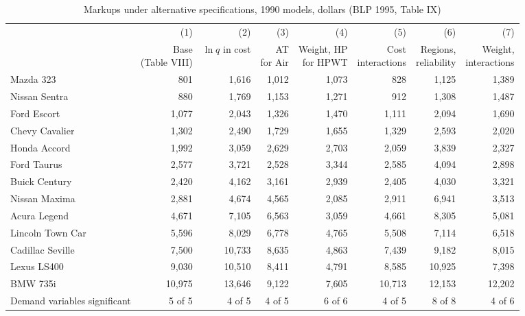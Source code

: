 \begin{table}[htbp]
\centering
\caption{Markups under alternative specifications, 1990 models, dollars (BLP 1995, Table IX)}
\label{tab:08-blp-robust}
\footnotesize
\setlength{\tabcolsep}{4pt}
\begin{tabular}{@{}lrrrrrrr@{}}
\toprule
 & (1) & (2) & (3) & (4) & (5) & (6) & (7) \\
 & \makecell{Base\\(Table VIII)} & \makecell{$\ln q$\\in cost} & \makecell{AT\\for Air}
 & \makecell{Weight, HP\\for HPWT} & \makecell{Cost\\interactions} & \makecell{Regions,\\reliability}
 & \makecell{Weight,\\interactions} \\
\midrule
Mazda 323        & 801    & 1,616  & 1,012 & 1,073 & 828    & 1,125  & 1,389 \\
Nissan Sentra    & 880    & 1,769  & 1,153 & 1,271 & 912    & 1,308  & 1,487 \\
Ford Escort      & 1,077  & 2,043  & 1,326 & 1,470 & 1,111  & 2,094  & 1,690 \\
Chevy Cavalier   & 1,302  & 2,490  & 1,729 & 1,655 & 1,329  & 2,593  & 2,020 \\
Honda Accord     & 1,992  & 3,059  & 2,629 & 2,703 & 2,059  & 3,839  & 2,327 \\
Ford Taurus      & 2,577  & 3,721  & 2,528 & 3,344 & 2,585  & 4,094  & 2,898 \\
Buick Century    & 2,420  & 4,162  & 3,161 & 2,939 & 2,405  & 4,030  & 3,321 \\
Nissan Maxima    & 2,881  & 4,674  & 4,565 & 2,085 & 2,911  & 6,941  & 3,513 \\
Acura Legend     & 4,671  & 7,105  & 6,563 & 3,059 & 4,661  & 8,305  & 5,081 \\
Lincoln Town Car & 5,596  & 8,029  & 6,778 & 4,765 & 5,508  & 7,114  & 6,518 \\
Cadillac Seville & 7,500  & 10,733 & 8,635 & 4,863 & 7,439  & 9,182  & 8,015 \\
Lexus LS400      & 9,030  & 10,510 & 8,411 & 4,791 & 8,585  & 10,925 & 7,398 \\
BMW 735i         & 10,975 & 13,646 & 9,122 & 7,605 & 10,713 & 12,153 & 12,202 \\
\midrule
Demand variables significant & 5 of 5 & 4 of 5 & 4 of 5 & 6 of 6 & 4 of 5 & 8 of 8 & 4 of 6 \\
\bottomrule
\end{tabular}


\end{table}
